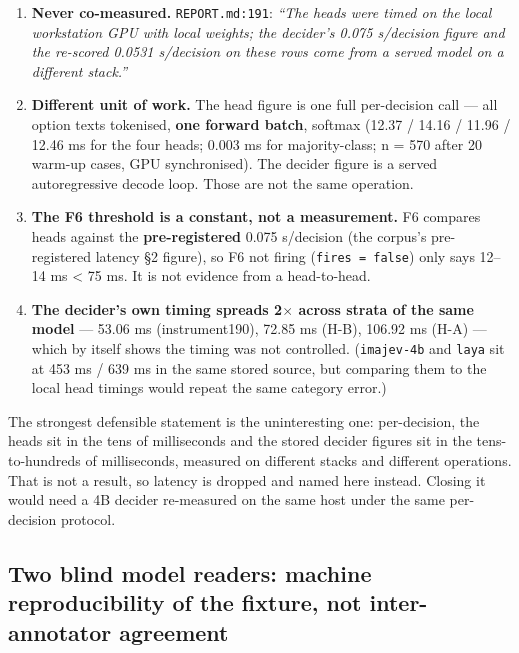 \documentclass[10pt]{article}
\begin{document}
\begin{enumerate}
\item \textbf{Never co-measured.} \texttt{REPORT.md:191}: \emph{``The heads were timed on the local workstation GPU with local weights; the decider's 0.075 s/decision figure and the re-scored 0.0531 s/decision on these rows come from a served model on a different stack.''}
\item \textbf{Different unit of work.} The head figure is one full per-decision call --- all option texts tokenised, \textbf{one forward batch}, softmax (12.37 / 14.16 / 11.96 / 12.46 ms for the four heads; 0.003 ms for majority-class; n = 570 after 20 warm-up cases, GPU synchronised). The decider figure is a served autoregressive decode loop. Those are not the same operation.
\item \textbf{The F6 threshold is a constant, not a measurement.} F6 compares heads against the \textbf{pre-registered} 0.075 s/decision (the corpus's pre-registered latency \S2 figure), so F6 not firing (\texttt{fires = false}) only says 12--14 ms < 75 ms. It is not evidence from a head-to-head.
\item \textbf{The decider's own timing spreads 2$\times$ across strata of the same model} --- 53.06 ms (instrument190), 72.85 ms (H-B), 106.92 ms (H-A) --- which by itself shows the timing was not controlled. (\texttt{imajev-4b} and \texttt{laya} sit at 453 ms / 639 ms in the same stored source, but comparing them to the local head timings would repeat the same category error.)
\end{enumerate}

The strongest defensible statement is the uninteresting one: per-decision, the heads sit in the tens of milliseconds and the stored decider figures sit in the tens-to-hundreds of milliseconds, measured on different stacks and different operations. That is not a result, so latency is dropped and named here instead. Closing it would need a 4B decider re-measured on the same host under the same per-decision protocol.

\subsection{Two blind model readers: machine reproducibility of the fixture, \textbf{not} inter-annotator agreement}
\end{document}
